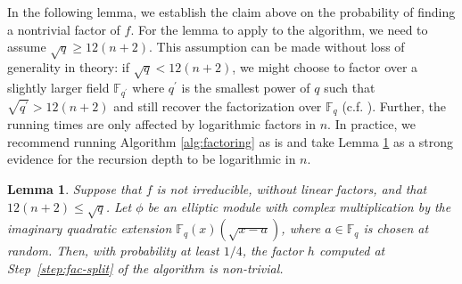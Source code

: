 \documentclass[12pt]{article}
\theoremstyle{plain}
\newtheorem{lemma}[theorem]{Lemma}
\theoremstyle{definition}
\def\F{\ensuremath{\mathbb{F}}}
\begin{document}
In the following lemma, we establish the claim above on the probability of
finding a nontrivial factor of $f$. For the lemma to apply to the
algorithm, we need to assume $\sqrt{q} \ge 12(n+2)$.  This assumption
can be made without loss of generality in theory: if $\sqrt{q} <
12(n+2)$, we might choose to factor over a slightly larger field
$\F_{q^\prime}$ where $q^\prime$ is the smallest power of $q$ such
that $\sqrt{q^\prime} > 12(n+2)$ and still recover the factorization
over $\F_q$ (c.f. \cite[Remark 3.2]{nar}). Further, the running times
are only affected by logarithmic factors in $n$. In practice, we
recommend running Algorithm \ref{alg:factoring} as is and take Lemma
\ref{splitting_lemma} as a strong evidence for the recursion depth to
be logarithmic in $n$.
\begin{lemma}
  \label{splitting_lemma}
  Suppose that $f$ is not irreducible, without linear factors, and that $12(n+2) \le
  \sqrt{q}$. Let $\phi$ be an elliptic module with complex
  multiplication by the imaginary quadratic extension
  $\F_q(x)(\sqrt{x-a})$, where $a \in \F_q$ is chosen at random. Then,
  with probability at least $1/4$, the factor $h$ computed at
  Step~\ref{step:fac-split} of the algorithm is non-trivial.
\end{lemma}
\end{document}
